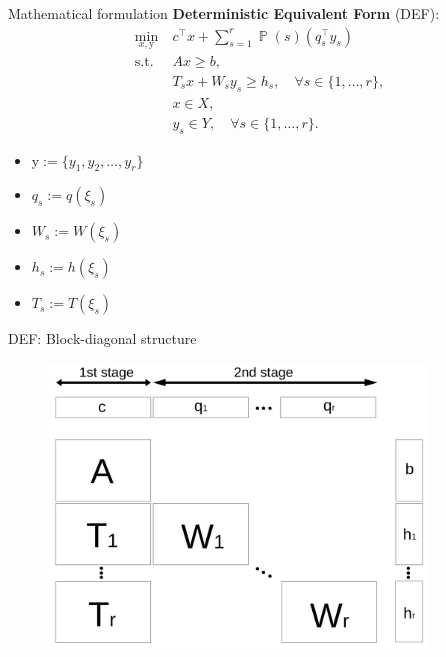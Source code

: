 \documentclass{beamer}
\DeclareMathOperator*{\PP}{\mathbb{P}}
\begin{document}
	\begin{frame}{Mathematical formulation}
	\textbf{Deterministic Equivalent Form} (DEF):
	\begin{subequations}\label{sip:ef}
		\begin{align}
		\min_{x,\mathrm{y}}\ &c^{\top}x + \sum_{s=1}^{r}\PP(s) (q_s^{\top}y_s) \label{ef:obj}\\ 
		\mathrm{s.t.}\ &Ax\ge b,  \label{ef:b}\\
		&T_s x+W_s y_s\ge h_s,\quad\forall s\in\{1,\ldots,r\}, \label{ef:c} \\
		&x\in X, \label{ef:d} \\
		&y_s \in Y,\quad\forall s\in\{1,\ldots,r\}. \label{ef:e}
		\end{align}
	\end{subequations}
	\vspace{-0.4cm}
	\begin{itemize}
		\item $\mathrm{y}:=\{y_1,y_2,\ldots,y_r\}$
		\item $q_s:=q(\xi_s)$
		\item $W_s:=W(\xi_s)$
		\item $h_s:=h(\xi_s)$
		\item $T_s:=T(\xi_s)$
	\end{itemize}
	\end{frame}
	
	\begin{frame}{DEF: Block-diagonal structure}
		\begin{figure}
			\begin{center}
				\includegraphics[width=0.9\textwidth]{stagewise_sparsity_slide}
			\end{center}
		\end{figure}
	\end{frame}
\end{document}
